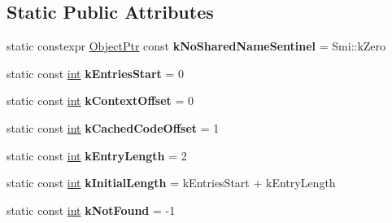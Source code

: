 \subsection*{Static Public Attributes}
\begin{DoxyCompactItemize}
\item 
\mbox{\label{classv8_1_1internal_1_1SharedFunctionInfo_ab4ca26bb36c1f76d5ee7e715ac057dab}} 
static constexpr \mbox{\hyperlink{classv8_1_1internal_1_1ObjectPtr}{Object\+Ptr}} const {\bfseries k\+No\+Shared\+Name\+Sentinel} = Smi\+::k\+Zero
\item 
\mbox{\label{classv8_1_1internal_1_1SharedFunctionInfo_a729064902568c99387215e69f5dcbfc3}} 
static const \mbox{\hyperlink{classint}{int}} {\bfseries k\+Entries\+Start} = 0
\item 
\mbox{\label{classv8_1_1internal_1_1SharedFunctionInfo_ae457da58033018f41b8300f61a4961d7}} 
static const \mbox{\hyperlink{classint}{int}} {\bfseries k\+Context\+Offset} = 0
\item 
\mbox{\label{classv8_1_1internal_1_1SharedFunctionInfo_a0d13a7375ce7bdd5590a7ace53e7515d}} 
static const \mbox{\hyperlink{classint}{int}} {\bfseries k\+Cached\+Code\+Offset} = 1
\item 
\mbox{\label{classv8_1_1internal_1_1SharedFunctionInfo_ae6a1d8883ff11916d52d1b13b0c6a41d}} 
static const \mbox{\hyperlink{classint}{int}} {\bfseries k\+Entry\+Length} = 2
\item 
\mbox{\label{classv8_1_1internal_1_1SharedFunctionInfo_aaf4511ccafdd97f715e55e7e8cf8a967}} 
static const \mbox{\hyperlink{classint}{int}} {\bfseries k\+Initial\+Length} = k\+Entries\+Start + k\+Entry\+Length
\item 
\mbox{\label{classv8_1_1internal_1_1SharedFunctionInfo_a1e596df8d07293d1c359639d9b111b8f}} 
static const \mbox{\hyperlink{classint}{int}} {\bfseries k\+Not\+Found} = -\/1
\item 
\mbox{\label{classv8_1_1internal_1_1SharedFunctionInfo_a2a6e517ac573fb950e9e04c6797c6694}} 

\end{DoxyCompactItemize}
